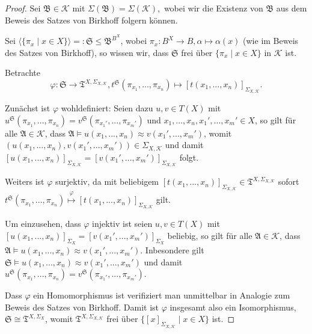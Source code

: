 \begin{proof}
    Sei $\mathfrak{B} \in \mathcal{K}$ mit $\Sigma(\mathfrak{B}) = \Sigma(\mathcal{K}),$
    wobei wir die Existenz von $\mathfrak{B}$ aus dem Beweis des Satzes von Birkhoff folgern können.
    
    Sei $\langle \{ \pi_x \mid x \in X \} \rangle =: \mathfrak{S} \leq \mathfrak{B}^{B^X}$, wobei $\pi_x : B^X \to B, \alpha \mapsto \alpha(x)$ (wie im Beweis des Satzes von Birkhoff), so wissen wir, dass $\mathfrak{S}$ frei über $\{ \pi_x \mid x \in X \}$ in $\mathcal{K}$ ist.

    Betrachte
    $$ \varphi: \mathfrak{S} \to \mathfrak{T}^{X, \Sigma_{X,\mathcal{K}}}, t^\mathfrak{S} (\pi_{x_1}, ..., \pi_{x_n}) \mapsto [t(x_1,...,x_n)]_{\Sigma_{X,\mathcal{K}}}. $$

    Zunächst ist $\varphi$ wohldefiniert: Seien dazu $u, v \in T(X)$ mit $u^\mathfrak{S} (\pi_{x_1}, ..., \pi_{x_n}) = v^\mathfrak{S}(\pi_{x_1'}, ..., \pi_{x_m'})$ und $x_1,\ldots,x_n,x_1',\ldots,x_m'\in X$, so gilt für alle $\mathfrak{A} \in \mathcal{K}$, dass $\mathfrak{A} \models u(x_1, ..., x_n) \approx v(x_1', ..., x_m')$, womit $(u(x_1, ..., x_n), v(x_1', ..., x_m')) \in \Sigma_{X,\mathcal{K}}$ und damit $[u(x_1, ..., x_n)]_{\Sigma_{X,\mathcal{K}}} = [v(x_1', ..., x_m')]_{\Sigma_{X,\mathcal{K}}}$ folgt.

    Weiters ist $\varphi$ surjektiv, da mit beliebigem $[t(x_1,...,x_n)]_{\Sigma_{X,\mathcal{K}}} \in \mathfrak{T}^{X, \Sigma_{X,\mathcal{K}}}$ sofort \\ $t^\mathfrak{S}(\pi_{x_1}, ..., \pi_{x_n}) \overset{\varphi}{\mapsto} [t(x_1,...,x_n)]_{\Sigma_{X,\mathcal{K}}}$ gilt.

    Um einzusehen, dass $\varphi$ injektiv ist seien $u, v \in T(X)$ mit $[u(x_1, ..., x_n)]_{\Sigma_X} = [v(x_1', ..., x_m')]_{\Sigma_X}$ beliebig, so gilt für alle $\mathfrak{A} \in \mathcal{K}$, dass $\mathfrak{A} \models u(x_1, ..., x_n) \approx v(x_1', ..., x_m')$. Inbesondere gilt $\mathfrak{S} \models u(x_1, ..., x_n) \approx v(x_1', ..., x_m')$ und damit $u^\mathfrak{S}(\pi_{x_1}, ..., \pi_{x_n}) = v^\mathfrak{S}(\pi_{x_1'}, ..., \pi_{x_m'})$.

    Dass $\varphi$ ein Homomorphismus ist verifiziert man unmittelbar in Analogie zum Beweis des Satzes von Birkhoff. Damit ist $\varphi$ insgesamt also ein Isomorphismus, $\mathfrak{S} \cong \mathfrak{T}^{X, \Sigma_X}$, womit $\mathfrak{T}^{X, \Sigma_{X,\mathcal{K}}}$ frei über $\{ [x]_{\Sigma_{X,\mathcal{K}}} \mid x \in X \}$ ist.
\end{proof}

